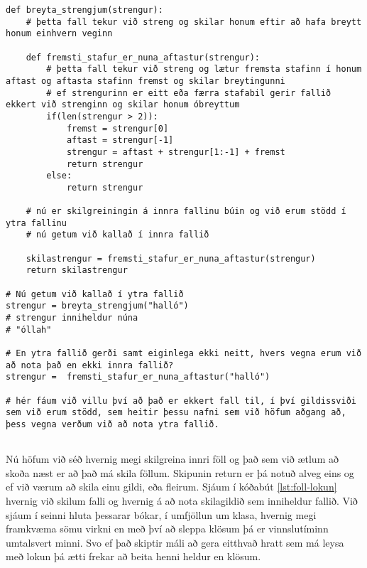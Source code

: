 \begin{lstlisting}[caption=Innri föll kynnt, label=lst:foll-innri-foll]
def breyta_strengjum(strengur):
	# þetta fall tekur við streng og skilar honum eftir að hafa breytt honum einhvern veginn
	
	def fremsti_stafur_er_nuna_aftastur(strengur):
		# þetta fall tekur við streng og lætur fremsta stafinn í honum aftast og aftasta stafinn fremst og skilar breytingunni 
		# ef strengurinn er eitt eða færra stafabil gerir fallið ekkert við strenginn og skilar honum óbreyttum
		if(len(strengur > 2)):
			fremst = strengur[0]
			aftast = strengur[-1]
			strengur = aftast + strengur[1:-1] + fremst
			return strengur
		else:
			return strengur
			
	# nú er skilgreiningin á innra fallinu búin og við erum stödd í ytra fallinu
	# nú getum við kallað í innra fallið
	
	skilastrengur = fremsti_stafur_er_nuna_aftastur(strengur)
	return skilastrengur
	
# Nú getum við kallað í ytra fallið
strengur = breyta_strengjum("halló")
# strengur inniheldur núna
# "óllah"

# En ytra fallið gerði samt eiginlega ekki neitt, hvers vegna erum við að nota það en ekki innra fallið?
strengur =  fremsti_stafur_er_nuna_aftastur("halló")

# hér fáum við villu því að það er ekkert fall til, í því gildissviði sem við erum stödd, sem heitir þessu nafni sem við höfum aðgang að, þess vegna verðum við að nota ytra fallið.
		
\end{lstlisting}

Nú höfum við séð hvernig megi skilgreina innri föll og það sem við ætlum að skoða næst er að það má skila föllum.
Skipunin return er þá notuð alveg eins og ef við værum að skila einu gildi, eða fleirum.
Sjáum í kóðabút \ref{lst:foll-lokun} hvernig við skilum falli og hvernig á að nota skilagildið sem inniheldur fallið.
Við sjáum í seinni hluta þessarar bókar, í umfjöllun um klasa, hvernig megi framkvæma sömu virkni en með því að sleppa klösum þá er vinnslutíminn umtalsvert minni.
Svo ef það skiptir máli að gera eitthvað hratt sem má leysa með lokun þá ætti frekar að beita henni heldur en klösum.


